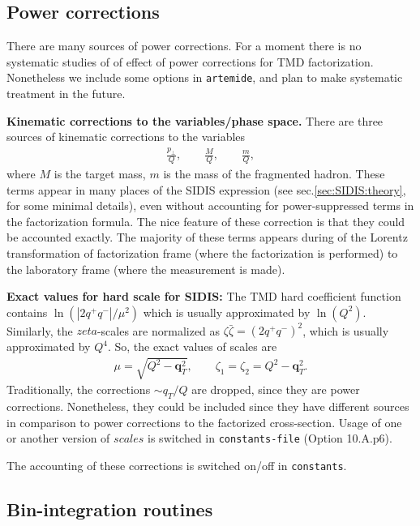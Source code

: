 \documentclass[prd,nofootinbib,eqsecnum,final]{revtex4}
\newcommand{\nn}{\nonumber}
\renewcommand{\(}{\left(}
\renewcommand{\)}{\right)}
\renewcommand{\[}{\left[}
\renewcommand{\]}{\right]}
\renewcommand{\vec}[1]{\bm{#1}}
\begin{document}
\subsection{Power corrections}

There are many sources of power corrections. For a moment there is no systematic studies of of effect of power corrections for TMD factorization. Nonetheless we include some options in \texttt{artemide}, and plan to make systematic treatment in the future.

\textbf{Kinematic corrections to the variables/phase space.} There are three sources of kinematic corrections to the variables
\begin{eqnarray}\nn
\frac{p_\perp}{Q},\qquad \frac{M}{Q},\qquad \frac{m}{Q},
\end{eqnarray}
where $M$ is the target mass, $m$ is the mass of the fragmented hadron. These terms appear in many places of the SIDIS expression (see sec.\ref{sec:SIDIS:theory}, for some minimal details), even without accounting for power-suppressed terms in the factorization formula. The nice feature of these correction is that they could be accounted exactly. The majority of these terms appears during of the Lorentz transformation of factorization frame (where the factorization is performed) to the laboratory frame (where the measurement is made).

\textbf{Exact values for hard scale for SIDIS:} The TMD hard coefficient function contains $\ln(|2q^+q^-|/\mu^2)$ which is usually approximated by $\ln(Q^2)$. Similarly, the $zeta$-scales are normalized as $\zeta \bar \zeta=(2q^+q^-)^2$, which is usually approximated by $Q^4$. So, the exact values of scales are
\begin{eqnarray}
\mu=\sqrt{Q^2-\vec q_T^2},\qquad \zeta_1=\zeta_2=Q^2-\vec q_T^2.
\end{eqnarray}
Traditionally, the corrections $\sim q_T/Q$ are dropped, since they are power corrections. Nonetheless, they could be included since they have different sources in comparison to power corrections to the factorized cross-section. Usage of one or another version of $scales$ is switched in \texttt{constants-file} (Option 10.A.p6).

The accounting of these corrections is switched on/off in \texttt{constants}. 

\subsection{Bin-integration routines}
\end{document}
